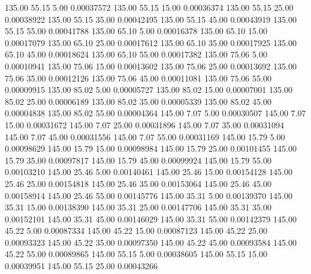     135.00     55.15      5.00     0.00037572
    135.00     55.15     15.00     0.00036374
    135.00     55.15     25.00     0.00038922
    135.00     55.15     35.00     0.00042495
    135.00     55.15     45.00     0.00043919
    135.00     55.15     55.00     0.00041788
    135.00     65.10      5.00     0.00016378
    135.00     65.10     15.00     0.00017079
    135.00     65.10     25.00     0.00017612
    135.00     65.10     35.00     0.00017925
    135.00     65.10     45.00     0.00018624
    135.00     65.10     55.00     0.00017382
    135.00     75.06      5.00     0.00010941
    135.00     75.06     15.00     0.00013602
    135.00     75.06     25.00     0.00013692
    135.00     75.06     35.00     0.00012126
    135.00     75.06     45.00     0.00011081
    135.00     75.06     55.00     0.00009915
    135.00     85.02      5.00     0.00005727
    135.00     85.02     15.00     0.00007001
    135.00     85.02     25.00     0.00006189
    135.00     85.02     35.00     0.00005339
    135.00     85.02     45.00     0.00004838
    135.00     85.02     55.00     0.00004364
    145.00      7.07      5.00     0.00030507
    145.00      7.07     15.00     0.00031672
    145.00      7.07     25.00     0.00031896
    145.00      7.07     35.00     0.00031094
    145.00      7.07     45.00     0.00031556
    145.00      7.07     55.00     0.00031169
    145.00     15.79      5.00     0.00098629
    145.00     15.79     15.00     0.00098984
    145.00     15.79     25.00     0.00101455
    145.00     15.79     35.00     0.00097817
    145.00     15.79     45.00     0.00099924
    145.00     15.79     55.00     0.00103210
    145.00     25.46      5.00     0.00140461
    145.00     25.46     15.00     0.00154128
    145.00     25.46     25.00     0.00154818
    145.00     25.46     35.00     0.00153064
    145.00     25.46     45.00     0.00158914
    145.00     25.46     55.00     0.00145776
    145.00     35.31      5.00     0.00139370
    145.00     35.31     15.00     0.00138390
    145.00     35.31     25.00     0.00147706
    145.00     35.31     35.00     0.00152101
    145.00     35.31     45.00     0.00146029
    145.00     35.31     55.00     0.00142379
    145.00     45.22      5.00     0.00087334
    145.00     45.22     15.00     0.00087123
    145.00     45.22     25.00     0.00093323
    145.00     45.22     35.00     0.00097350
    145.00     45.22     45.00     0.00093584
    145.00     45.22     55.00     0.00089865
    145.00     55.15      5.00     0.00038605
    145.00     55.15     15.00     0.00039951
    145.00     55.15     25.00     0.00043266
